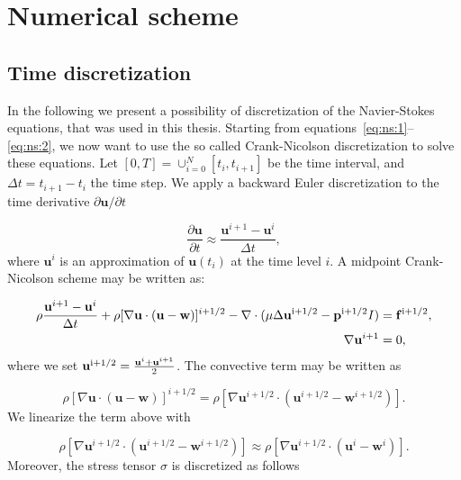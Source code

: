 \documentclass[11pt,a4paper,titlepage]{report}
\begin{document}
\section{Numerical scheme}

\subsection{Time discretization}
In the following we present a possibility of discretization of the Navier-Stokes equations, that was used in this thesis. Starting from equations~\eqref{eq:ns:1}--\eqref{eq:ns:2}, we now want to use the so called Crank-Nicolson discretization to solve these equations. Let $[0, T] = \cup^N_{i=0} [t_i, t_{i+1}] $ be the time interval, and $\Delta t = t_{i+1} - t_i$ the time step. We apply a backward Euler discretization to the time derivative $\partial \mathbf{u}/ \partial t$

\begin{equation}
\frac{\partial \mathbf{u}}{\partial t} \approx \frac{\mathbf{u}^{i+1} -\mathbf{u}^i }{\Delta t},
\end{equation}
where $\mathbf{u}^i$ is an approximation of $\mathbf{u}(t_i)$ at the time level $i$. A midpoint Crank-Nicolson scheme may be written as:

\begin{align}
\rho \frac{\mathbf{u}^{i+1} - \mathbf{u}^i}{\Delta t} + \rho [\nabla \mathbf{u} \cdot (\mathbf{u} - \mathbf{w})]^{i+1/2} - \nabla \cdot (\mu \Delta \mathbf{u}^{\rm  i+1/2} - \mathbf{p}^{\rm i+1/2}I) &= \mathbf{f}^{\rm i+1/2}, \\
\nabla \mathbf{u}^{i+1} &= 0,
\end{align}
where we set $\mathbf{u}^{\rm i+1/2} = \frac{\mathbf{u}^i + \mathbf{u}^{i+1}}{2}$.
The convective term may be written as

\begin{equation}
\rho [\nabla \mathbf{u} \cdot (\mathbf{u} - \mathbf{w})]^{i+1/2} = \rho [\nabla \mathbf{u}^{i+1/2} \cdot (\mathbf{u}^{i+1/2} - \mathbf{w}^{i+1/2})].
\end{equation}
We linearize the term above with

\begin{equation}
\rho [\nabla \mathbf{u}^{i+1/2} \cdot (\mathbf{u}^{i+1/2} - \mathbf{w}^{i+1/2})] \approx \rho [\nabla \mathbf{u}^{i+1/2} \cdot (\mathbf{u}^i - \mathbf{w}^i)].
\end{equation}
Moreover, the stress tensor $\sigma$ is discretized as follows 
\end{document}
